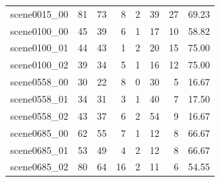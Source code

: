 \begin{table}[t]
\begin{tabular}{lrrrrrrr}
scene0015\_00 & 81 & 73 & 8 & 2 & 39 & 27 & 69.23 \\
scene0100\_00 & 45 & 39 & 6 & 1 & 17 & 10 & 58.82 \\
scene0100\_01 & 44 & 43 & 1 & 2 & 20 & 15 & 75.00 \\
scene0100\_02 & 39 & 34 & 5 & 1 & 16 & 12 & 75.00 \\
scene0558\_00 & 30 & 22 & 8 & 0 & 30 & 5 & 16.67 \\
scene0558\_01 & 34 & 31 & 3 & 1 & 40 & 7 & 17.50 \\
scene0558\_02 & 43 & 37 & 6 & 2 & 54 & 9 & 16.67 \\
scene0685\_00 & 62 & 55 & 7 & 1 & 12 & 8 & 66.67 \\
scene0685\_01 & 53 & 49 & 4 & 2 & 12 & 8 & 66.67 \\
scene0685\_02 & 80 & 64 & 16 & 2 & 11 & 6 & 54.55 \\
\bottomrule
\end{tabular}
\end{table}
